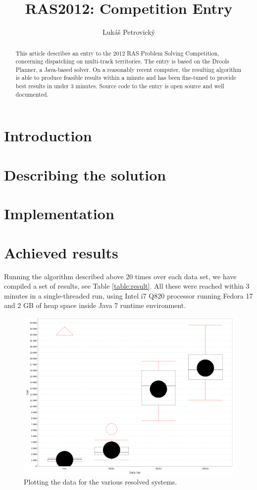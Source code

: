 \documentclass[10pt,a4paper,draft]{article}
\author{Lukáš Petrovický}
\title{RAS2012: Competition Entry}
\begin{document}
\maketitle

\begin{abstract}
This article describes an entry to the 2012 RAS Problem Solving Competition, concerning dispatching on multi-track territories. The entry is based on the Drools Planner, a Java-based solver. On a reasonably recent computer, the resulting algorithm is able to produce feasible results within a minute and has been fine-tuned to provide best results in under 3 minutes. Source code to the entry is open source and well documented.
\end{abstract}

\section{Introduction}

\section{Describing the solution}

\section{Implementation}

\section{Achieved results}

Running the algorithm described above 20 times over each data set, we have compiled a set of results, see Table \ref{table:result}. All these were reached within 3 minutes in a single-threaded run, using Intel i7 Q820 processor running Fedora 17 and 2 GB of heap space inside Java 7 runtime environment.



\begin{figure}
\centering
\includegraphics[width=120mm]{chart.png}
\caption{Plotting the data for the various resolved systems.}
\end{figure}
\end{document}

